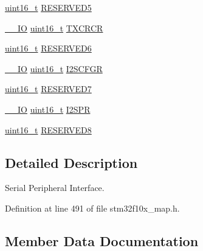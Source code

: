 \begin{DoxyCompactItemize}
\item 
\hyperlink{_p_e___types_8h_a1f1825b69244eb3ad2c7165ddc99c956}{uint16\+\_\+t} \hyperlink{struct_s_p_i___type_def_ab63440e38c7872a8ed11fb2d8d94714e}{R\+E\+S\+E\+R\+V\+E\+D5}
\item 
\hyperlink{group___c_m_s_i_s___c_m3__core__definitions_gaec43007d9998a0a0e01faede4133d6be}{\+\_\+\+\_\+\+IO} \hyperlink{_p_e___types_8h_a1f1825b69244eb3ad2c7165ddc99c956}{uint16\+\_\+t} \hyperlink{struct_s_p_i___type_def_a3c0c1be66bc0a1846274a7511f4a36f5}{T\+X\+C\+R\+CR}
\item 
\hyperlink{_p_e___types_8h_a1f1825b69244eb3ad2c7165ddc99c956}{uint16\+\_\+t} \hyperlink{struct_s_p_i___type_def_a0870177921541602a44f744f1b66e823}{R\+E\+S\+E\+R\+V\+E\+D6}
\item 
\hyperlink{group___c_m_s_i_s___c_m3__core__definitions_gaec43007d9998a0a0e01faede4133d6be}{\+\_\+\+\_\+\+IO} \hyperlink{_p_e___types_8h_a1f1825b69244eb3ad2c7165ddc99c956}{uint16\+\_\+t} \hyperlink{struct_s_p_i___type_def_a20a4775ce461eec0d9a437bed464c0a5}{I2\+S\+C\+F\+GR}
\item 
\hyperlink{_p_e___types_8h_a1f1825b69244eb3ad2c7165ddc99c956}{uint16\+\_\+t} \hyperlink{struct_s_p_i___type_def_a98df0a538eb077b2cfc5194eda200f1b}{R\+E\+S\+E\+R\+V\+E\+D7}
\item 
\hyperlink{group___c_m_s_i_s___c_m3__core__definitions_gaec43007d9998a0a0e01faede4133d6be}{\+\_\+\+\_\+\+IO} \hyperlink{_p_e___types_8h_a1f1825b69244eb3ad2c7165ddc99c956}{uint16\+\_\+t} \hyperlink{struct_s_p_i___type_def_aecee11b0d2e534b5243e9db6a0e10026}{I2\+S\+PR}
\item 
\hyperlink{_p_e___types_8h_a1f1825b69244eb3ad2c7165ddc99c956}{uint16\+\_\+t} \hyperlink{struct_s_p_i___type_def_a0ffe762827b71caff20c75bf105387f6}{R\+E\+S\+E\+R\+V\+E\+D8}
\end{DoxyCompactItemize}


\subsection{Detailed Description}
Serial Peripheral Interface. 

Definition at line 491 of file stm32f10x\+\_\+map.\+h.



\subsection{Member Data Documentation}
